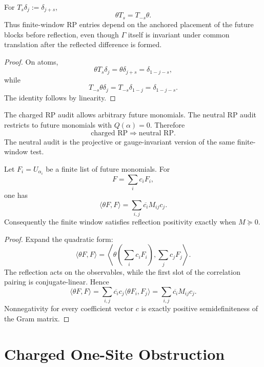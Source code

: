 \begin{proposition}
\label{prop:innovation-input-translation-reflection-anticommute}
For $T_s\delta_j:=\delta_{j+s}$,
$$
\theta T_s=T_{-s}\theta.
$$
Thus finite-window RP entries depend on the anchored placement of the
future blocks before reflection, even though $\Gamma$ itself is invariant
under common translation after the reflected difference is formed.
\end{proposition}

\begin{proof}
On atoms,
$$
\theta T_s\delta_j=\theta\delta_{j+s}=\delta_{1-j-s},
$$
while
$$
T_{-s}\theta\delta_j=T_{-s}\delta_{1-j}=\delta_{1-j-s}.
$$
The identity follows by linearity.
\end{proof}

\begin{definition}
\label{def:innovation-input-charged-neutral-rp}
The charged RP audit allows arbitrary future monomials. The neutral RP
audit restricts to future monomials with $Q(\alpha)=0$. Therefore
$$
\text{charged RP}
\Longrightarrow
\text{neutral RP}.
$$
The neutral audit is the projective or gauge-invariant version of the same
finite-window test.
\end{definition}

\begin{theorem}
\label{thm:innovation-input-finite-window-gram-criterion}
Let $F_i=U_{\alpha_i}$ be a finite list of future monomials. For
$$
F=\sum_i c_iF_i,
$$
one has
$$
\langle\theta F,F\rangle
=
\sum_{i,j}\overline{c_i}M_{ij}c_j.
$$
Consequently the finite window satisfies reflection positivity exactly
when $M\succeq0$.
\end{theorem}

\begin{proof}
Expand the quadratic form:
$$
\langle\theta F,F\rangle
=
\left\langle
\theta\left(\sum_i c_iF_i\right),
\sum_j c_jF_j
\right\rangle.
$$
The reflection acts on the observables, while the first slot of the
correlation pairing is conjugate-linear. Hence
$$
\langle\theta F,F\rangle
=
\sum_{i,j}\overline{c_i}c_j
\langle\theta F_i,F_j\rangle
=
\sum_{i,j}\overline{c_i}M_{ij}c_j.
$$
Nonnegativity for every coefficient vector $c$ is exactly positive
semidefiniteness of the Gram matrix.
\end{proof}

\section{Charged One-Site Obstruction}
\label{sec:innovation-input-charged-one-site-rp}

